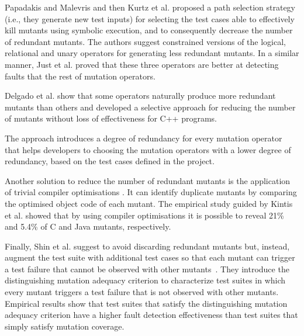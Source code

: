 Papadakis and Malevris \cite{papadakis2012mutation} and then Kurtz et al. \cite{kurtz2015static} proposed a path selection strategy (i.e., they generate new test inputs) for selecting the test cases able to effectively kill mutants using symbolic execution, and to consequently decrease the number of redundant mutants. 
The authors suggest constrained versions of the logical, relational and unary operators for generating less redundant mutants. 
In a similar manner, Just et al. \cite{just2012redundant,just2015higher} proved that these three operators are better at detecting faults that the rest of mutation operators.

Delgado et al. \cite{delgado2017assessment} show that some operators naturally produce more redundant mutants than others and
developed a selective approach for reducing the number of mutants without loss of effectiveness for C++ programs. 

The approach introduces a degree of redundancy for every mutation operator that helps developers to choosing the mutation operators with a lower degree of redundancy, based on the test cases defined in the project.

Another solution to reduce the number of redundant mutants is the application of trivial compiler optimisations \cite{papadakis2015trivial, kintis2017detecting,papadakis2019mutation}. 
It can identify duplicate mutants by comparing the optimised object code of each mutant. The empirical study guided by Kintis et al. \cite{kintis2017detecting} showed that by using compiler optimisations it is possible to reveal 21\% and 5.4\% of C and Java mutants, respectively.


Finally, Shin et al. suggest to avoid discarding redundant mutants but, instead, augment the test suite with additional test cases so that 
each mutant can trigger a test failure that cannot be observed with other mutants~\cite{Shin:TSE:DCriterion:2018}. 
They introduce the distinguishing mutation adequacy criterion to characterize test suites in which every mutant triggers a test failure that is not observed with other mutants.
Empirical results show that test suites that satisfy the distinguishing mutation adequacy criterion have a higher
 fault detection effectiveness than test suites that simply satisfy mutation coverage.



